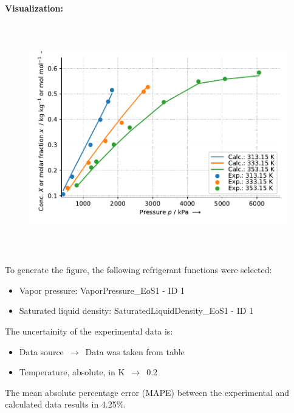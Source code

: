 \textbf{Visualization:}
%
\begin{figure}[!htp]
{\noindent\includegraphics[height=10cm, keepaspectratio]{figs/abs/abs_R-143a_lubricant_BAB32_MixingRule_1.pdf}}
\end{figure}
%

To generate the figure, the following refrigerant functions were selected:
\begin{itemize}
\item Vapor pressure: VaporPressure\_EoS1 - ID 1
\item Saturated liquid density: SaturatedLiquidDensity\_EoS1 - ID 1
\end{itemize}

The uncertainity of the experimental data is:
\begin{itemize}
\item Data source $\,\to\,$ Data was taken from table
\item Temperature, absolute, in $\si{\kelvin}$ $\,\to\,$ 0.2
\end{itemize}

The mean absolute percentage error (MAPE) between the experimental and calculated data results in 4.25\%.
\FloatBarrier
\newpage
